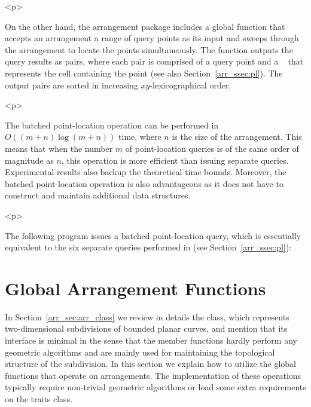 \begin{ccHtmlOnly}<p>\end{ccHtmlOnly}
On the other hand, the arrangement package includes a global
 function that accepts an arrangement a range of
query points as its input and sweeps through the arrangement to
locate the points simultaneously. The function outputs the query
results as pairs, where each pair is comprised of a query point
and a \cgal\  that represents the cell containing the
point (see also Section~\ref{arr_ssec:pl}). The output pairs are
sorted in increasing $xy$-lexicographical order.

\begin{ccHtmlOnly}<p>\end{ccHtmlOnly}
The batched point-location operation can be performed in
$O\left((m+n)\log{(m+n)}\right)$ time, where $n$ is the size of
the arrangement. This means that when the number $m$ of
point-location queries is of the same order of magnitude as $n$,
this operation is more efficient than issuing separate queries.
Experimental results also backup the theoretical time bounds.
Moreover, the batched point-location operation is also
advantageous as it does not have to construct and maintain
additional data structures.

\begin{ccHtmlOnly}<p>\end{ccHtmlOnly}
The following program issues a batched point-location query, which
is essentially equivalent to the six separate queries performed in
 (see Section~\ref{arr_ssec:pl}):


\section{Global Arrangement Functions}
\label{arr_sec:gl_funcs}
%
In Section~\ref{arr_sec:arr_class} we review in details the
 class, which represents two-dimensional
subdivisions of bounded planar curves, and mention that its
interface is minimal in the sense that the member functions hardly
perform any geometric algorithms and are mainly used for
maintaining the topological structure of the subdivision. In this
section we explain how to utilize the global functions that operate on
arrangements. The implementation of these operations typically require
non-trivial geometric algorithms or load some extra requirements on
the traits class.

